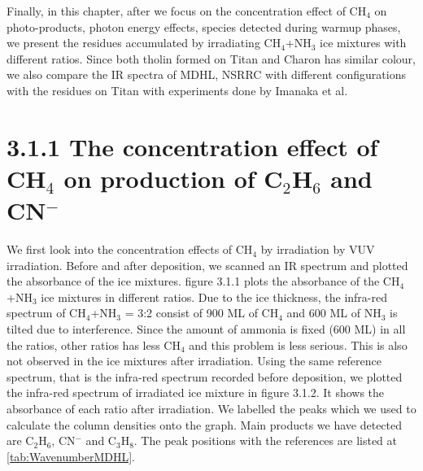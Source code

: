 Finally, in this chapter, after we focus on the concentration effect of CH$_4$ on photo-products, photon energy effects, species detected during warmup phases, we present the residues accumulated by irradiating CH$_4$+NH$_3$ ice mixtures with different ratios. Since both tholin formed on Titan and Charon has similar colour, we also compare the IR spectra of MDHL, NSRRC with different configurations with the residues on Titan with experiments done by Imanaka et al.\\
\section{3.1.1 The concentration effect of CH$_4$ on production of C$_2$H$_6$ and CN$^-$}
We first look into the concentration effects of CH$_4$ by irradiation by VUV irradiation. Before and after deposition, we scanned an IR spectrum and plotted the absorbance of the ice mixtures. figure 3.1.1 plots the absorbance of the CH$_4$+NH$_3$ ice mixtures in different ratios. Due to the ice thickness, the infra-red spectrum of CH$_4$+NH$_3$ = 3:2 consist of 900 ML of CH$_4$ and 600 ML of NH$_3$ is tilted due to interference. Since the amount of ammonia is fixed (600 ML) in all the ratios, other ratios has less CH$_4$ and this problem is less serious. This is also not observed in the ice mixtures after irradiation. Using the same reference spectrum, that is the infra-red spectrum recorded before deposition, we plotted the infra-red spectrum of irradiated ice mixture in figure 3.1.2. It shows the absorbance of each ratio after irradiation. We labelled the peaks which we used to calculate the column densities onto the graph. Main products we have detected are C$_2$H$_6$, CN$^-$ and C$_3$H$_8$. The peak positions with the references are listed at \ref{tab:WavenumberMDHL}.\\

